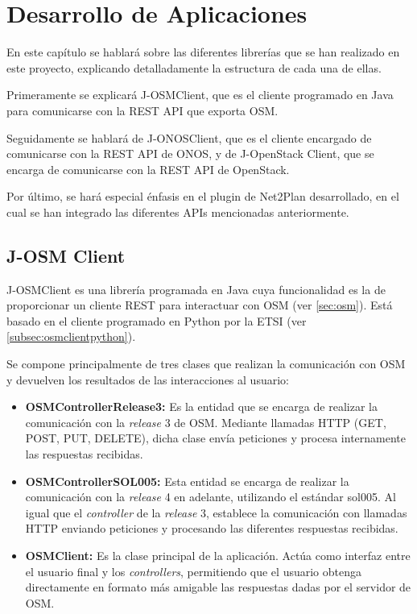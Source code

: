 \chapter{Desarrollo de Aplicaciones}

En este capítulo se hablará sobre las diferentes librerías que se han realizado en este proyecto, explicando detalladamente la estructura de cada una de ellas.

Primeramente se explicará J-OSMClient, que es el cliente programado en Java para comunicarse con la REST API que exporta OSM.

Seguidamente se hablará de J-ONOSClient, que es el cliente encargado de comunicarse con la REST API de ONOS, y de J-OpenStack Client, que se encarga de comunicarse con la REST API de OpenStack.

Por último, se hará especial énfasis en el plugin de Net2Plan desarrollado, en el cual se han integrado las diferentes APIs mencionadas anteriormente.


\section{J-OSM Client}
\label{sec:osmclient}

J-OSMClient es una librería programada en Java cuya funcionalidad es la de proporcionar un cliente REST para interactuar con OSM (ver \ref{sec:osm}). Está basado en el cliente programado en Python por la ETSI (ver \ref{subsec:osmclientpython}).

Se compone principalmente de tres clases que realizan la comunicación con OSM y devuelven los resultados de las interacciones al usuario:

\begin{itemize}
	\item \textbf{OSMControllerRelease3:} Es la entidad que se encarga de realizar la comunicación con la \textit{release} 3 de OSM. Mediante llamadas HTTP (GET, POST, PUT, DELETE), dicha clase envía peticiones y procesa internamente las respuestas recibidas.
	
	\item \textbf{OSMControllerSOL005:} Esta entidad se encarga de realizar la comunicación con la \textit{release} 4 en adelante, utilizando el estándar sol005. Al igual que el \textit{controller} de la \textit{release} 3, establece la comunicación con llamadas HTTP enviando peticiones y procesando las diferentes respuestas recibidas.
	
	\item \textbf{OSMClient:} Es la clase principal de la aplicación. Actúa como interfaz entre el usuario final y los \textit{controllers}, permitiendo que el usuario obtenga directamente en formato más amigable las respuestas dadas por el servidor de OSM.
\end{itemize}

